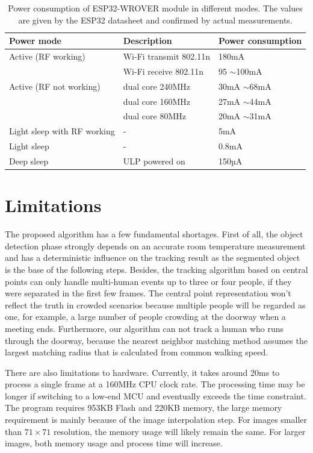 \begin{table}[]
\centering
\begin{tabular}{|l|l|l|}
\hline
\textbf{Power mode}                  & \textbf{Description}            & \textbf{Power consumption} \\ \hline
Active (RF working)         & Wi-Fi transmit 802.11n & 180mA             \\
                            & Wi-Fi receive 802.11n  & 95 $\sim$100mA    \\ \hline
Active (RF not working)     & dual core 240MHz       & 30mA $\sim$68mA   \\
                            & dual core 160MHz       & 27mA $\sim$44mA   \\
                            & dual core 80MHz        & 20mA $\sim$31mA   \\ \hline
Light sleep with RF working & -                      & 5mA               \\
Light sleep                 & -                      & 0.8mA             \\ \hline
Deep sleep                  & ULP powered on         & 150µA             \\ \hline
\end{tabular}\caption{Power consumption of ESP32-WROVER module in different modes. The values are given by the ESP32 datasheet \cite{esp32datasheet} and confirmed by actual measurements.} \label{tab:esp32_power}
\end{table}

\section{Limitations}
The proposed algorithm has a few fundamental shortages. First of all, the object detection phase strongly depends on an accurate room temperature measurement and has a deterministic influence on the tracking result as the segmented object is the base of the following steps. Besides, the tracking algorithm based on central points can only handle multi-human events up to three or four people, if they were separated in the first few frames. The central point representation won't reflect the truth in crowded scenarios because multiple people will be regarded as one, for example, a large number of people crowding at the doorway when a meeting ends. Furthermore, our algorithm can not track a human who runs through the doorway, because the nearest neighbor matching method assumes the largest matching radius that is calculated from common walking speed.

There are also limitations to hardware. Currently, it takes around 20ms to process a single frame at a 160MHz CPU clock rate. The processing time may be longer if switching to a low-end MCU and eventually exceeds the time constraint. The program requires 953KB Flash and 220KB memory, the large memory requirement is mainly because of the image interpolation step. For images smaller than $71\times71$ resolution, the memory usage will likely remain the same. For larger images, both memory usage and process time will increase. 
